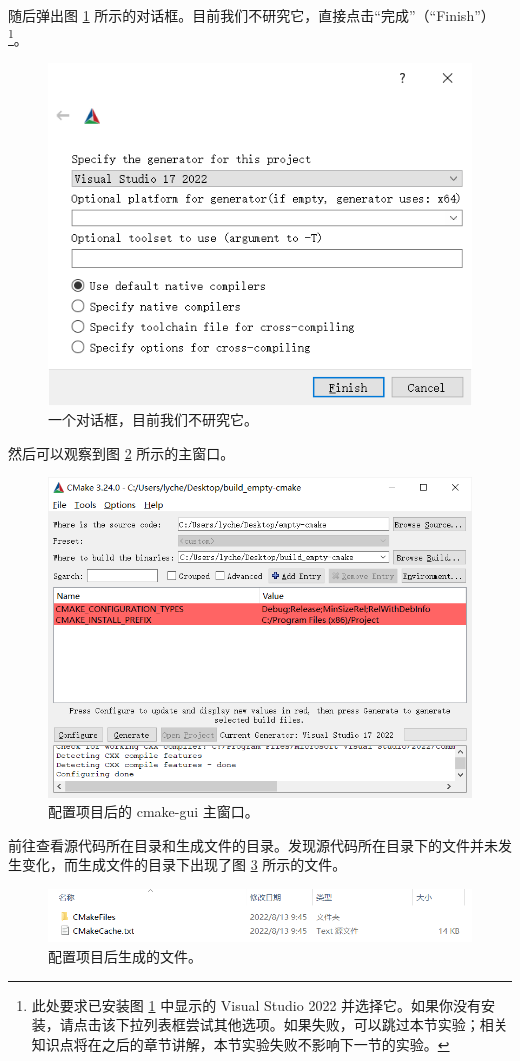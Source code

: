 \begin{enumerate}
	随后弹出图 \ref{fig:empty-cmake-3} 所示的对话框。目前我们不研究它，直接点击“完成”（“Finish”）\footnote{此处要求已安装图 \ref{fig:empty-cmake-3} 中显示的 Visual Studio 2022 并选择它。如果你没有安装，请点击该下拉列表框尝试其他选项。如果失败，可以跳过本节实验；相关知识点将在之后的章节讲解，本节实验失败不影响下一节的实验。}。

	\begin{figure}[H]
		\centering
		\includegraphics[width=0.4\linewidth]{assets/empty-cmake-3}
		\caption{一个对话框，目前我们不研究它。}
		\label{fig:empty-cmake-3}
	\end{figure}

	然后可以观察到图 \ref{fig:empty-cmake-4} 所示的主窗口。

	\begin{figure}[H]
		\centering
		\includegraphics[width=0.7\linewidth]{assets/empty-cmake-4}
		\caption{配置项目后的 cmake-gui 主窗口。}
		\label{fig:empty-cmake-4}
	\end{figure}

	前往查看源代码所在目录和生成文件的目录。发现源代码所在目录下的文件并未发生变化，而生成文件的目录下出现了图 \ref{fig:empty-cmake-5} 所示的文件。

	\begin{figure}[H]
		\centering
		\includegraphics[width=0.9\linewidth]{assets/empty-cmake-5}
		\caption{配置项目后生成的文件。}
		\label{fig:empty-cmake-5}
	\end{figure}


\end{enumerate}
